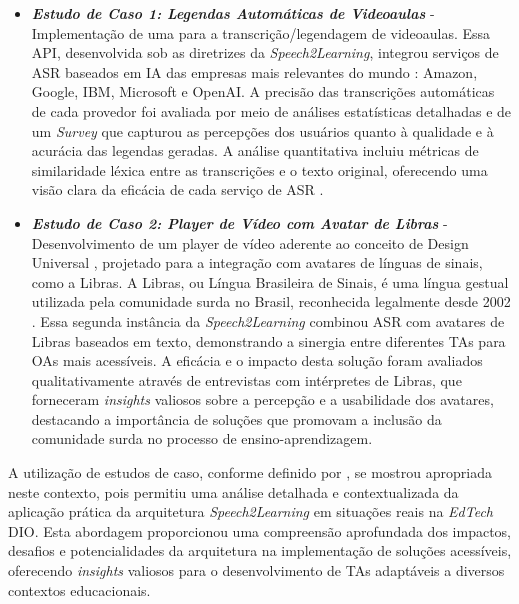 \begin{itemize}
\item \textbf{\textit{Estudo de Caso 1: Legendas Automáticas de Videoaulas}} - Implementação de uma  para a transcrição/legendagem de videoaulas. Essa API, desenvolvida sob as diretrizes da \textit{Speech2Learning}, integrou serviços de ASR baseados em IA das empresas mais relevantes do mundo \cite{Gartner2023}: Amazon, Google, IBM, Microsoft e OpenAI. A precisão das transcrições automáticas de cada provedor foi avaliada por meio de análises estatísticas detalhadas e de um \textit{Survey} que capturou as percepções dos usuários quanto à qualidade e à acurácia das legendas geradas. A análise quantitativa incluiu métricas de similaridade léxica entre as transcrições e o texto original, oferecendo uma visão clara da eficácia de cada serviço de ASR \cite{FalvoJr2023_HICSS}.


\item \textbf{\textit{Estudo de Caso 2: Player de Vídeo com Avatar de Libras}} - Desenvolvimento de um player de vídeo aderente ao conceito de Design Universal \cite{GovBr2023}, projetado para a integração com avatares de línguas de sinais, como a Libras. A Libras, ou Língua Brasileira de Sinais, é uma língua gestual utilizada pela comunidade surda no Brasil, reconhecida legalmente desde 2002 \cite{Quadros2019, Honora2017}. Essa segunda instância da \textit{Speech2Learning} combinou ASR com avatares de Libras baseados em texto, demonstrando a sinergia entre diferentes TAs para OAs mais acessíveis. A eficácia e o impacto desta solução foram avaliados qualitativamente através de entrevistas com intérpretes de Libras, que forneceram \textit{insights} valiosos sobre a percepção e a usabilidade dos avatares, destacando a importância de soluções que promovam a inclusão da comunidade surda no processo de ensino-aprendizagem.
\end{itemize}

A utilização de estudos de caso, conforme definido por , se mostrou apropriada neste contexto, pois permitiu uma análise detalhada e contextualizada da aplicação prática da arquitetura \textit{Speech2Learning} em situações reais na \textit{EdTech} DIO. Esta abordagem proporcionou uma compreensão aprofundada dos impactos, desafios e potencialidades da arquitetura na implementação de soluções acessíveis, oferecendo \textit{insights} valiosos para o desenvolvimento de TAs adaptáveis a diversos contextos educacionais.

